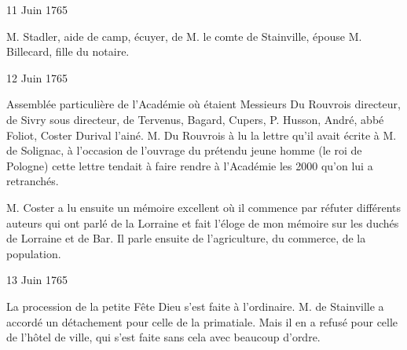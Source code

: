                      \begin{diary}{11 Juin 1765}{}


                           M. Stadler, aide de camp, écuyer,
                           de M. le
                              comte de Stainville, épouse M. Billecard,
                           fille du notaire. \bigskip


                     \end{diary}

                     \begin{diary}{12 Juin 1765}{}

                         Assemblée particulière de l'Académie où
                           étaient Messieurs
                           Du Rouvrois directeur, de Sivry
                           sous directeur, de Tervenus, Bagard, Cupers,
                           P. Husson, André, abbé Foliot,
                              Coster
                           Durival l'ainé. M. Du Rouvrois à lu la lettre
                           qu'il avait écrite à M. de
                              Solignac, à l'occasion
                           de l'ouvrage du prétendu jeune homme (le roi de Pologne)
                           cette lettre tendait à faire rendre à l'Académie
                           les 2000 qu'on lui a retranchés. \bigskip



                           M. Coster a lu ensuite un mémoire excellent
                           où il commence par réfuter différents auteurs
                           qui ont parlé de la Lorraine et fait l'éloge
                           de mon mémoire sur les duchés de Lorraine et de
                                 Bar. Il parle ensuite de l'agriculture, du
                           commerce, de la population. \bigskip


                     \end{diary}



                     \begin{diary}{13 Juin 1765}{}

                         La procession de la petite Fête
                           Dieu s'est faite
                           à l'ordinaire. M. de
                              Stainville a accordé un
                           détachement pour celle de la
                              primatiale. Mais
                           il en a refusé pour celle de l'hôtel de ville,
                           qui s'est faite sans cela avec beaucoup d'ordre. \bigskip


                     \end{diary}

